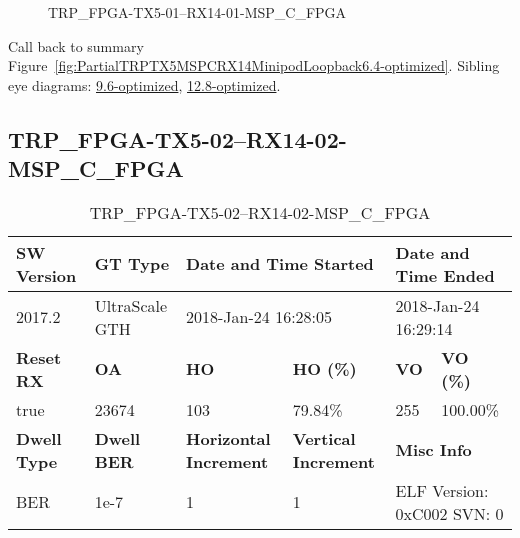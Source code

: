 \begin{figure}[h]
\caption{TRP\_FPGA-TX5-01--RX14-01-MSP\_C\_FPGA} \label{fig:TRPFPGATX501RX1401MSPCFPGA6.4-optimized}
\end{figure}

Call back to summary Figure~\ref{fig:PartialTRPTX5MSPCRX14MinipodLoopback6.4-optimized}.
Sibling eye diagrams: \hyperref[sec:TRPFPGATX501RX1401MSPCFPGA9.6-optimized]{9.6-optimized}, \hyperref[sec:TRPFPGATX501RX1401MSPCFPGA12.8-optimized]{12.8-optimized}.

\clearpage
\newpage


\subsection{TRP\_FPGA-TX5-02--RX14-02-MSP\_C\_FPGA}\label{sec:TRPFPGATX502RX1402MSPCFPGA6.4-optimized}

\begin{table}[h]
\centering
\caption{TRP\_FPGA-TX5-02--RX14-02-MSP\_C\_FPGA}
\label{tab:TRPFPGATX502RX1402MSPCFPGA6.4-optimized}
\begin{tabular}{@{}|l|l|l|l|l|l|@{}}
\toprule
\textbf{SW Version}                & \textbf{GT Type}   & \multicolumn{2}{l|}{\textbf{Date and Time Started}}            & \multicolumn{2}{l|}{\textbf{Date and Time Ended}}        \\ \midrule
2017.2                       & UltraScale GTH          & \multicolumn{2}{l|}{2018-Jan-24 16:28:05}                   & \multicolumn{2}{l|}{2018-Jan-24 16:29:14}               \\ \midrule
\textbf{Reset RX}                  & \textbf{OA} & \textbf{HO}   & \textbf{HO (\%)} & \textbf{VO} & \textbf{VO (\%)} \\ \midrule
true & 23674        & 103          & 79.84\%        & 255        & 100.00\%       \\ \midrule
\textbf{Dwell Type}                & \textbf{Dwell BER} & \textbf{Horizontal Increment} & \textbf{Vertical Increment}    & \multicolumn{2}{l|}{\textbf{Misc Info}}                  \\ \midrule
BER                            & 1e-7        & 1        & 1           & \multicolumn{2}{l|}{ELF Version: 0xC002 SVN: 0}                         \\ \bottomrule
\end{tabular}
\end{table}

